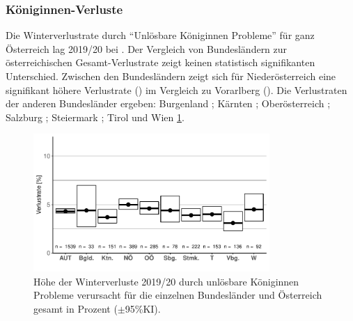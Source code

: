 

\subsubsection{Königinnen-Verluste}
\label{ss:koeniginnen_verluste:U}

Die Winterverlustrate durch \enquote{Unlösbare Königinnen Probleme} für ganz Österreich lag 2019/20 bei . Der Vergleich von Bundesländern zur österreichischen Gesamt-Verlustrate zeigt keinen statistisch signifikanten Unterschied. Zwischen den Bundesländern zeigt sich für Niederösterreich eine signifikant höhere Verlustrate () im Vergleich zu Vorarlberg ().
\newline
Die Verlustraten der anderen Bundesländer ergeben: Burgenland ; Kärnten ; Oberösterreich ; Salzburg ; Steiermark ; Tirol  und Wien  \cref{fig:u:queen:states}.

\begin{figure}[H]
  \centering
  \includegraphics[keepaspectratio,width=0.8\textwidth]{project-U-wintersterblichkeit/figures/plot_queen_states}
  \caption{Höhe der Winterverluste 2019/20 durch unlösbare Königinnen Probleme verursacht für die einzelnen Bundesländer und Österreich gesamt in Prozent ($\pm$95\%KI).}
  \label{fig:u:queen:states}
\end{figure}

\label{ss:koeniginnen_probleme:U}


